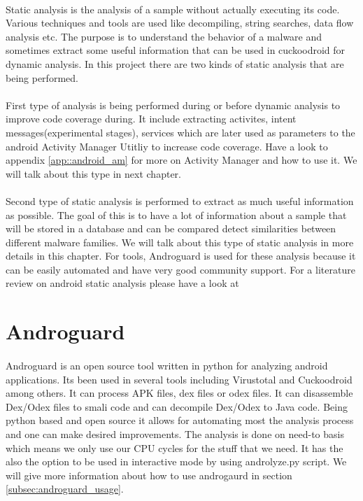 \documentclass[../main.tex]{subfile}
\begin{document}
	
		\paragraph{} Static analysis is the analysis of a sample without actually executing its code. Various techniques and tools are used like decompiling, string searches, data flow analysis etc. The purpose is to understand the behavior of a malware and sometimes extract some useful information that can be used in cuckoodroid for dynamic analysis. In this project there are two kinds of static analysis that are being performed.
		\paragraph{} First type of analysis is being performed during or before dynamic analysis to improve code coverage during. It include extracting activites, intent messages(experimental stages), services which are later used as parameters to the android Activity Manager Utitliy to increase code coverage. Have a look to appendix \ref{app::android_am} for more on Activity Manager and how to use it. We will talk about this type in next chapter.
		
		\paragraph{} Second type of static analysis is performed to extract as much useful information as possible. The goal of this is to have a lot of information about a sample that will be stored in a database and can be compared detect similarities between different malware families. We will talk about this type of static analysis in more details in this chapter. For tools, Androguard is used for these analysis because it can be easily automated and have very good community support. For a literature review on android static analysis please have a look at \cite{android_static_literature}	
		
		\section{Androguard}\label{sec:androguard}
		\paragraph{} Androguard is an open source tool written in python for analyzing android applications. Its been used in several tools including Virustotal and Cuckoodroid among others. It can process APK files, dex files or odex files. It can disassemble Dex/Odex files to smali code and can decompile Dex/Odex to Java code. Being python based and open source it allows for automating most the analysis process and one can make desired improvements. The analysis is done on need-to basis which means we only use our CPU cycles for the stuff that we need. It has the also the option to be used in interactive mode by using androlyze.py script. We will give more information about how to use androgaurd in section \ref{subsec:androguard_usage}.
		
\end{document}
